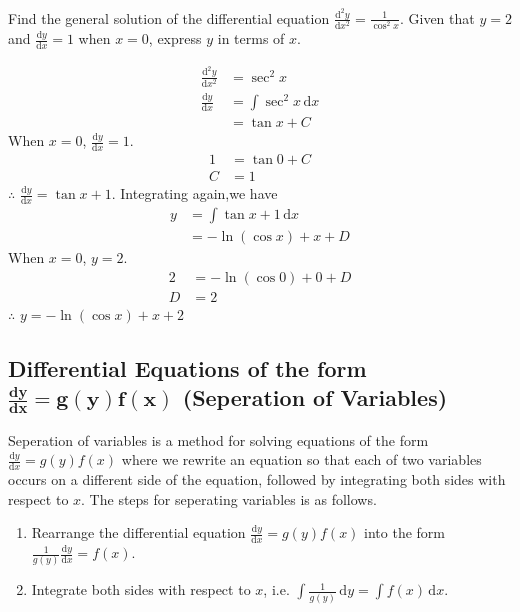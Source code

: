 \documentclass[11pt,a4paper]{book}
\begin{document}
\begin{example}

Find the general solution of the differential equation ${\displaystyle \frac{\mathrm{d}^{2}y}{\mathrm{d}x^{2}}=\frac{1}{\cos^{2}x}}$.
Given that $y=2$ and ${\displaystyle \frac{\mathrm{d}y}{\mathrm{d}x}=1}$ when $x=0$,
express $y$ in terms of $x$.

\Solution

\begin{align*}
\frac{\mathrm{d}^{2}y}{\mathrm{d}x^{2}} & =\sec^{2}x\\
\frac{\mathrm{d}y}{\mathrm{d}x} & =\int\sec^{2}x\, \mathrm{d}x\\
 & =\tan x+C
\end{align*}
When $x=0$, ${\displaystyle \frac{\mathrm{d}y}{\mathrm{d}x}=1}$.
\begin{align*}
1 & =\tan0+C\\
C & =1
\end{align*}
$\therefore$ ${\displaystyle \frac{\mathrm{d}y}{\mathrm{d}x}=\tan x+1}$. Integrating
again,we have
\begin{align*}
y & =\int\tan x+1\, \mathrm{d}x\\
 & =-\ln\left(\cos x\right)+x+D
\end{align*}
When $x=0$, $y=2$.
\begin{align*}
2 & =-\ln\left(\cos0\right)+0+D\\
D & =2
\end{align*}
$\therefore$ $y=-\ln\left(\cos x\right)+x+2$

\end{example}

\newpage

\subsection{Differential Equations of the form $\boldsymbol{\frac{\textbf{d}y}{\textbf{d}x}=g\left(y\right)f\left(x\right)}$ (Seperation of Variables)}

Seperation of variables is a method for solving equations of the form
${\displaystyle \frac{\mathrm{d}y}{\mathrm{d}x}=g\left(y\right)f\left(x\right)}$ where
we rewrite an equation so that each of two variables occurs on a different
side of the equation, followed by integrating both sides with respect
to $x$. The steps for seperating variables is as follows.

\begin{tcolorbox}[colback=blue!5, colframe=black,boxrule=.4pt, sharpish corners]

\begin{enumerate}
\item Rearrange the differential equation ${\displaystyle \frac{\mathrm{d}y}{\mathrm{d}x}=g\left(y\right)f\left(x\right)}$
into the form ${\displaystyle \frac{1}{g\left(y\right)}\frac{\mathrm{d}y}{\mathrm{d}x}=f\left(x\right)}$.
\item Integrate both sides with respect to $x$, i.e. ${\displaystyle \int}{\displaystyle \frac{1}{g\left(y\right)}\,\mathrm{d}y=\int f\left(x\right)\,\mathrm{d}x}$.
\end{enumerate}
\end{tcolorbox}
\end{document}
